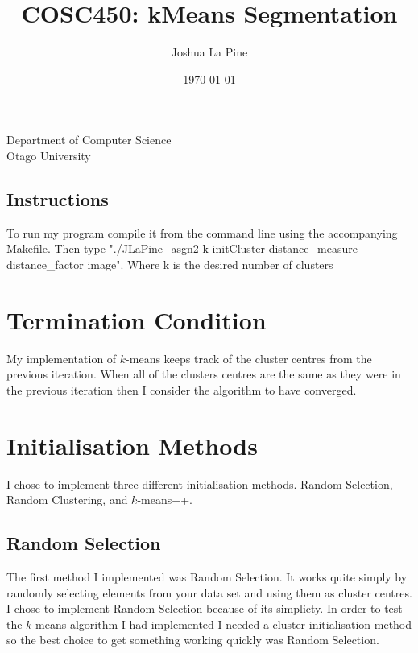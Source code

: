 \documentclass{article}
\title{COSC450: kMeans Segmentation} %
\author{Joshua La Pine} %
\date{\today} %
\begin{document}
\maketitle %

\begin{center}
Department of Computer Science \\
Otago University \\

\end{center}
\newpage

\tableofcontents
\newpage

\subsection{Instructions}

To run my program compile it from the command line using the accompanying Makefile. Then type "./JLaPine_asgn2 k initCluster distance_measure distance_factor image". Where k is the desired number of clusters

\section{Termination Condition}

My implementation of $k$-means keeps track of the cluster centres from the previous iteration. When all of the clusters centres are the same as they were in the previous iteration then I consider the algorithm to have converged. 

\section{Initialisation Methods}

I chose to implement three different initialisation methods. Random Selection, Random Clustering, and $k$-means++.

\subsection{Random Selection}

The first method I implemented was Random Selection. It works quite simply by randomly selecting elements from your data set and using them as cluster centres. I chose to implement Random Selection because of its simplicty. In order to test the $k$-means algorithm I had implemented I needed a cluster initialisation method so the best choice to get something working quickly was Random Selection. 
\end{document}
